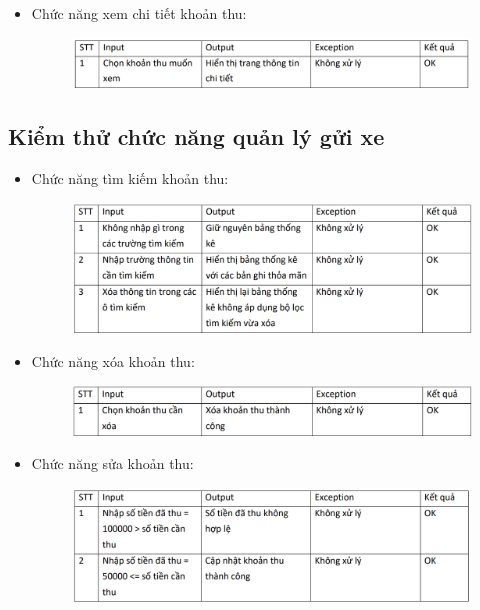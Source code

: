 \documentclass{article}
\begin{document}
\begin{itemize}
\begin{figure}[H]
    \end{figure}
    \item Chức năng xem chi tiết khoản thu:
    \begin{figure}[H]
        \centering
        \includegraphics[width=1\textwidth]{Kiểm thử/KT chi tiết khoản thu.png}
    \end{figure}    
\end{itemize}
\subsection{Kiểm thử chức năng quản lý gửi xe}
\begin{itemize}
    \item Chức năng tìm kiếm khoản thu:
    \begin{figure}[H]
        \centering
        \includegraphics[width=1\textwidth]{Kiểm thử/Kt tìm kiếm khoản thu.png}
    \end{figure}
    \vspace{2cm}
    \item Chức năng xóa khoản thu:
    \begin{figure}[H]
        \centering
        \includegraphics[width=1\textwidth]{Kiểm thử/KT xóa khoản thu.png}
    \end{figure}
    \item Chức năng sửa khoản thu:
    \begin{figure}[H]
        \centering
        \includegraphics[width=1\textwidth]{Kiểm thử/KT sửa khoản thu.png}

\end{figure}
\end{itemize}
\end{document}
